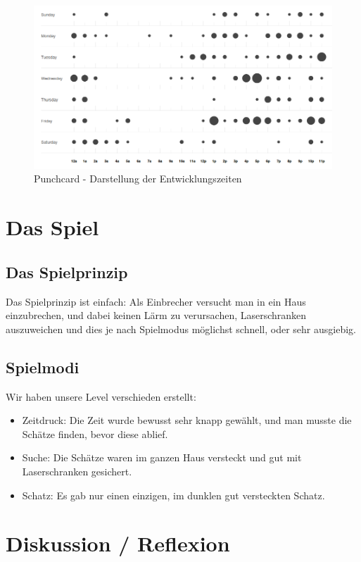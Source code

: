 \documentclass[12pt,a4paper]{scrartcl}
\begin{document}
\begin{figure}[h]
\centering
\includegraphics[scale=0.4]{img/punchcard.png}
\caption{Punchcard - Darstellung der Entwicklungszeiten}
\label{fig:punchcard}
\end{figure}

\section{Das Spiel}
\subsection{Das Spielprinzip}
Das Spielprinzip ist einfach: Als Einbrecher versucht man in ein Haus einzubrechen, und dabei keinen Lärm zu verursachen, Laserschranken auszuweichen
und dies je nach Spielmodus möglichst schnell, oder sehr ausgiebig.

\subsection{Spielmodi}
Wir haben unsere Level verschieden erstellt:
\begin{itemize}
\item Zeitdruck: Die Zeit wurde bewusst sehr knapp gewählt, und man musste die Schätze finden, bevor diese ablief.
\item Suche: Die Schätze waren im ganzen Haus versteckt und gut mit Laserschranken gesichert.
\item Schatz: Es gab nur einen einzigen, im dunklen gut versteckten Schatz.
\end{itemize}

\newpage
\section{Diskussion / Reflexion}
\end{document}
